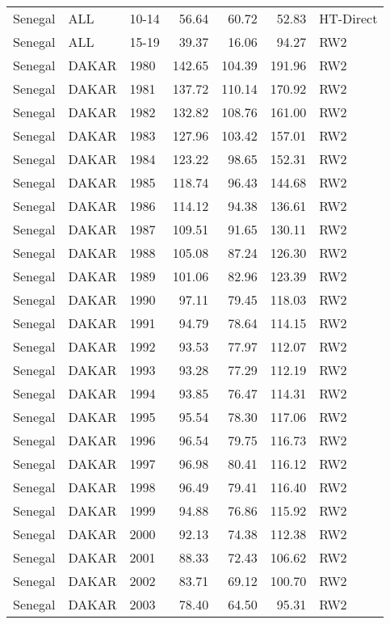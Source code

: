 \begin{longtable}{lllrrrl}
  Senegal & ALL & 10-14 & 56.64 & 60.72 & 52.83 & HT-Direct \\ 
  Senegal & ALL & 15-19 & 39.37 & 16.06 & 94.27 & RW2 \\ 
  Senegal & DAKAR & 1980 & 142.65 & 104.39 & 191.96 & RW2 \\ 
  Senegal & DAKAR & 1981 & 137.72 & 110.14 & 170.92 & RW2 \\ 
  Senegal & DAKAR & 1982 & 132.82 & 108.76 & 161.00 & RW2 \\ 
  Senegal & DAKAR & 1983 & 127.96 & 103.42 & 157.01 & RW2 \\ 
  Senegal & DAKAR & 1984 & 123.22 & 98.65 & 152.31 & RW2 \\ 
  Senegal & DAKAR & 1985 & 118.74 & 96.43 & 144.68 & RW2 \\ 
  Senegal & DAKAR & 1986 & 114.12 & 94.38 & 136.61 & RW2 \\ 
  Senegal & DAKAR & 1987 & 109.51 & 91.65 & 130.11 & RW2 \\ 
  Senegal & DAKAR & 1988 & 105.08 & 87.24 & 126.30 & RW2 \\ 
  Senegal & DAKAR & 1989 & 101.06 & 82.96 & 123.39 & RW2 \\ 
  Senegal & DAKAR & 1990 & 97.11 & 79.45 & 118.03 & RW2 \\ 
  Senegal & DAKAR & 1991 & 94.79 & 78.64 & 114.15 & RW2 \\ 
  Senegal & DAKAR & 1992 & 93.53 & 77.97 & 112.07 & RW2 \\ 
  Senegal & DAKAR & 1993 & 93.28 & 77.29 & 112.19 & RW2 \\ 
  Senegal & DAKAR & 1994 & 93.85 & 76.47 & 114.31 & RW2 \\ 
  Senegal & DAKAR & 1995 & 95.54 & 78.30 & 117.06 & RW2 \\ 
  Senegal & DAKAR & 1996 & 96.54 & 79.75 & 116.73 & RW2 \\ 
  Senegal & DAKAR & 1997 & 96.98 & 80.41 & 116.12 & RW2 \\ 
  Senegal & DAKAR & 1998 & 96.49 & 79.41 & 116.40 & RW2 \\ 
  Senegal & DAKAR & 1999 & 94.88 & 76.86 & 115.92 & RW2 \\ 
  Senegal & DAKAR & 2000 & 92.13 & 74.38 & 112.38 & RW2 \\ 
  Senegal & DAKAR & 2001 & 88.33 & 72.43 & 106.62 & RW2 \\ 
  Senegal & DAKAR & 2002 & 83.71 & 69.12 & 100.70 & RW2 \\ 
  Senegal & DAKAR & 2003 & 78.40 & 64.50 & 95.31 & RW2 \\ 

\end{longtable}

